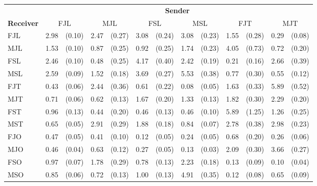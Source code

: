 
\begin{tabular}{ll@{\,\,\,}rl@{\,\,\,}rl@{\,\,\,}rl@{\,\,\,}rl@{\,\,\,}rl@{\,\,\,}r}
\toprule
    & \multicolumn{12}{c}{\textbf{Sender}} \\
    \cmidrule(lr){2- 13 }
\textbf{Receiver}
    & \multicolumn{2}{c}{\textnormal{FJL}}
    & \multicolumn{2}{c}{\textnormal{MJL}}
    & \multicolumn{2}{c}{\textnormal{FSL}}
    & \multicolumn{2}{c}{\textnormal{MSL}}
    & \multicolumn{2}{c}{\textnormal{FJT}}
    & \multicolumn{2}{c}{\textnormal{MJT}} \\
    \cmidrule(r){1-1}
    \cmidrule(lr){2-3}
    \cmidrule(lr){4-5}
    \cmidrule(lr){6-7}
    \cmidrule(lr){8-9}
    \cmidrule(lr){10-11}
    \cmidrule(lr){12-13}
    \textnormal{FJL} & 2.98 & (0.10) & 2.47 & (0.27) & 3.08 & (0.24) & 3.08 & (0.23) & 1.55 & (0.28) & 0.29 & (0.08) \\
    \textnormal{MJL} & 1.53 & (0.10) & 0.87 & (0.25) & 0.92 & (0.25) & 1.74 & (0.23) & 4.05 & (0.73) & 0.72 & (0.20) \\
    \textnormal{FSL} & 2.46 & (0.10) & 0.48 & (0.25) & 4.17 & (0.40) & 2.42 & (0.19) & 0.21 & (0.16) & 2.66 & (0.39) \\
    \textnormal{MSL} & 2.59 & (0.09) & 1.52 & (0.18) & 3.69 & (0.27) & 5.53 & (0.38) & 0.77 & (0.30) & 0.55 & (0.12) \\
    \textnormal{FJT} & 0.43 & (0.06) & 2.44 & (0.36) & 0.61 & (0.22) & 0.08 & (0.05) & 1.63 & (0.33) & 5.89 & (0.52) \\
    \textnormal{MJT} & 0.71 & (0.06) & 0.62 & (0.13) & 1.67 & (0.20) & 1.33 & (0.13) & 1.82 & (0.30) & 2.29 & (0.20) \\
    \textnormal{FST} & 0.96 & (0.13) & 0.44 & (0.20) & 0.46 & (0.13) & 0.46 & (0.10) & 5.89 & (1.25) & 1.26 & (0.25) \\
    \textnormal{MST} & 0.65 & (0.05) & 2.91 & (0.29) & 1.88 & (0.18) & 0.84 & (0.07) & 2.78 & (0.38) & 2.98 & (0.23) \\
    \textnormal{FJO} & 0.47 & (0.05) & 0.41 & (0.10) & 0.12 & (0.05) & 0.24 & (0.05) & 0.68 & (0.20) & 0.26 & (0.06) \\
    \textnormal{MJO} & 0.46 & (0.04) & 0.63 & (0.12) & 0.27 & (0.05) & 0.13 & (0.03) & 2.09 & (0.30) & 3.66 & (0.27) \\
    \textnormal{FSO} & 0.97 & (0.07) & 1.78 & (0.29) & 0.78 & (0.13) & 2.23 & (0.18) & 0.13 & (0.09) & 0.10 & (0.04) \\
    \textnormal{MSO} & 0.85 & (0.06) & 0.72 & (0.13) & 1.00 & (0.13) & 4.91 & (0.35) & 0.12 & (0.08) & 0.65 & (0.09) \\
\end{tabular}

